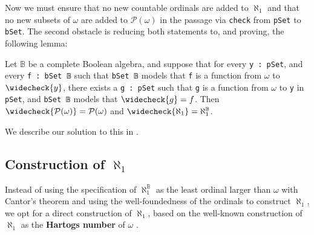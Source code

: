 \documentclass[sigplan,10pt,review, anonymous]{acmart}
\newcommand{\lil}{\lstinline}
\theoremstyle{definition}
\begin{document}
Now we must ensure that no new countable ordinals are added to \(\aleph_1\) and that no new subsets of \(\omega\) are added to \(\mathcal{P}(\omega)\) in the passage via \lil{check} from \lil{pSet} to \lil{bSet}. The second obstacle is reducing both statements to, and proving, the following lemma:

\begin{lemma}\label{lemma:function-reflect-suffices}
  Let \(\mathbb{B}\) be a complete Boolean algebra, and suppose that for every \lil{y : pSet}, and every \lil{f : bSet 𝔹} such that \lil{bSet 𝔹} models that \lil{f} is a function from \(\omega\) to \(\widecheck{y}\), there exists a \lil{g : pSet} such that \lil{g} is a function from \(\omega\) to \lil{y} in \lil{pSet}, and \lil{bSet 𝔹} models that \(\widecheck{g} = f\).
  Then \(\widecheck{\mathcal{P}(\omega)} = \mathcal{P}(\omega)\) and \(\widecheck{\aleph_1} = \aleph_1^{\mathbb{B}}\).
\end{lemma}

We describe our solution to this in .





\subsection{Construction of $\aleph_1$} \label{subsect:forcing:aleph-1}
Instead of using the specification of \(\aleph_1^{\mathbb{B}}\) as the least ordinal larger than \(\omega\) with Cantor's theorem and using the well-foundedness of the ordinals to construct \(\aleph_1\),
we opt for a direct construction of \(\aleph_1\), based on the well-known construction of \(\aleph_1\) as the \textbf{Hartogs number} of \(\omega\) \cite{hartogs1915problem}.

\end{document}
